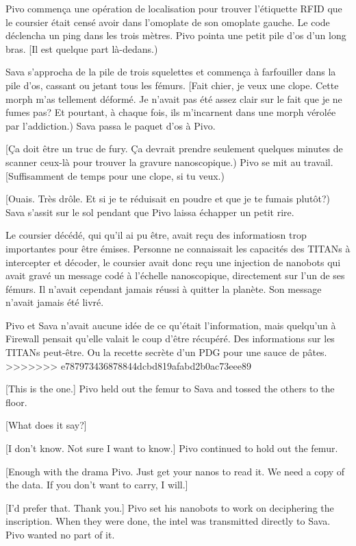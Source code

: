 Pivo commença une opération de localisation pour trouver l'étiquette RFID que le coursier était censé avoir dans l'omoplate de son omoplate gauche. Le code déclencha un ping dans les trois mètres. Pivo pointa une petit pile d'os d'un long bras. [Il est quelque part là-dedans.) 

Sava s'approcha de la pile de trois squelettes et commença à farfouiller dans la pile d'os, cassant ou jetant tous les fémurs. [Fait chier, je veux une clope. Cette morph m'as tellement déformé. Je n'avait pas été assez clair sur le fait que je ne fumes pas? Et pourtant, à chaque fois, ils m'incarnent dans une morph vérolée par l'addiction.) Sava passa le paquet d'os à Pivo. 

[Ça doit être un truc de fury. Ça devrait prendre seulement quelques minutes de scanner ceux-là pour trouver la gravure nanoscopique.) Pivo se mit au travail. [Suffisamment de temps pour une clope, si tu veux.) 

[Ouais. Très drôle. Et si je te réduisait en poudre et que je te fumais plutôt?) Sava s'assit sur le sol pendant que Pivo laissa échapper un petit rire. 

Le coursier décédé, qui qu'il ai pu être, avait reçu des informatiosn trop importantes pour être émises. Personne ne connaissait les capacités des TITANs à intercepter et décoder, le coursier avait donc reçu une injection de nanobots qui avait gravé un message codé à l'échelle nanoscopique, directement sur l'un de ses fémurs. Il n'avait cependant jamais réussi à quitter la planète. Son message n'avait jamais été livré. 

Pivo et Sava n'avait aucune idée de ce qu'était l'information, mais quelqu'un à Firewall  pensait qu'elle valait le coup d'être récupéré. Des informations sur les TITANs peut-être. Ou la recette secrète d'un PDG pour une sauce de pâtes. 
>>>>>>> e787973436878844dcbd819afabd2b0ac73eee89

[This is the one.] Pivo held out the femur to Sava and tossed the others to the floor. 

[What does it say?] 

[I don't know. Not sure I want to know.] Pivo continued to hold out the femur. 

[Enough with the drama Pivo. Just get your nanos to read it. We need a copy of the data. If you don't want to carry, I will.] 

[I'd prefer that. Thank you.] Pivo set his nanobots to work on deciphering the inscription. When they were done, the intel was transmitted directly to Sava. Pivo wanted no part of it. 

